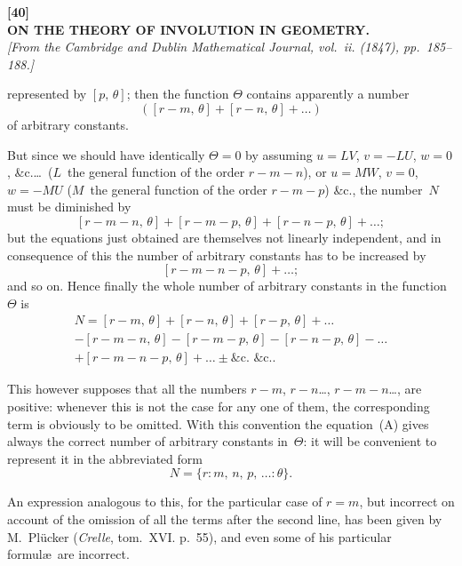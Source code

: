 \documentclass[11pt,a4paper]{article}
\begin{document}
\setlength{\parindent}{1em}
\setlength{\parskip}{0pt}


\begin{center}
\textbf{[40]}\\[4pt]
\textbf{\large ON THE THEORY OF INVOLUTION IN GEOMETRY.}\\[4pt]
\textit{[From the Cambridge and Dublin Mathematical Journal, vol.~ii. (1847), pp.~185--188.]}
\end{center}

\vspace{6pt}

represented by $[p,\,\theta]$; then the function $\Theta$ contains apparently a number
\[
([r-m,\,\theta] + [r-n,\,\theta] + \ldots)
\]
of arbitrary constants.

But since we should have identically $\Theta = 0$ by assuming $u = LV$, $v = -LU$, $w = 0$, \&c.\ldots\ ($L$~the general function of the order $r-m-n$), or $u = MW$, $v = 0$, $w = -MU$ ($M$~the general function of the order $r-m-p$) \&c., the number~$N$ must be diminished by
\[
[r-m-n,\,\theta] + [r-m-p,\,\theta] + [r-n-p,\,\theta] + \ldots;
\]
but the equations just obtained are themselves not linearly independent, and in consequence of this the number of arbitrary constants has to be increased by
\[
[r-m-n-p,\,\theta] + \ldots;
\]
and so on. Hence finally the whole number of arbitrary constants in the function~$\Theta$ is
\begin{multline*}
N = [r-m,\,\theta] + [r-n,\,\theta] + [r-p,\,\theta] + \ldots \\
- [r-m-n,\,\theta] - [r-m-p,\,\theta] - [r-n-p,\,\theta] - \ldots \\
+ [r-m-n-p,\,\theta] + \ldots \pm \text{\&c.\ \&c.} \tag{A}.
\end{multline*}

This however supposes that all the numbers $r-m$, $r-n$\ldots, $r-m-n$\ldots, are positive: whenever this is not the case for any one of them, the corresponding term is obviously to be omitted. With this convention the equation~(A) gives always the correct number of arbitrary constants in~$\Theta$: it will be convenient to represent it in the abbreviated form
\[
N = \{r : m,\, n,\, p,\, \ldots : \theta\}.
\]

An expression analogous to this, for the particular case of $r=m$, but incorrect on account of the omission of all the terms after the second line, has been given by M.~Pl\"ucker (\textit{Crelle}, tom.~XVI. p.~55), and even some of his particular formul\ae\ are incorrect.
\end{document}
